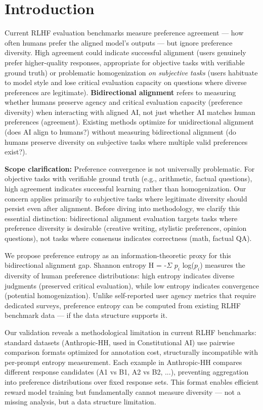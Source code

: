\section{Introduction}

Current RLHF evaluation benchmarks measure preference agreement — how often humans prefer the aligned model's outputs — but ignore preference diversity. High agreement could indicate successful alignment (users genuinely prefer higher-quality responses, appropriate for objective tasks with verifiable ground truth) or problematic homogenization \textit{on subjective tasks} (users habituate to model style and lose critical evaluation capacity on questions where diverse preferences are legitimate). \textbf{Bidirectional alignment} refers to measuring whether humans preserve agency and critical evaluation capacity (preference diversity) when interacting with aligned AI, not just whether AI matches human preferences (agreement). Existing methods optimize for unidirectional alignment (does AI align to humans?) without measuring bidirectional alignment (do humans preserve diversity on subjective tasks where multiple valid preferences exist?).

\textbf{Scope clarification:} Preference convergence is not universally problematic. For objective tasks with verifiable ground truth (e.g., arithmetic, factual questions), high agreement indicates successful learning rather than homogenization. Our concern applies primarily to subjective tasks where legitimate diversity should persist even after alignment. Before diving into methodology, we clarify this essential distinction: bidirectional alignment evaluation targets tasks where preference diversity is desirable (creative writing, stylistic preferences, opinion questions), not tasks where consensus indicates correctness (math, factual QA).

We propose preference entropy as an information-theoretic proxy for this bidirectional alignment gap. Shannon entropy H = -$\Sigma$ $p_i$ log($p_i$) measures the diversity of human preference distributions: high entropy indicates diverse judgments (preserved critical evaluation), while low entropy indicates convergence (potential homogenization). Unlike self-reported user agency metrics that require dedicated surveys, preference entropy can be computed from existing RLHF benchmark data — if the data structure supports it.

Our validation reveals a methodological limitation in current RLHF benchmarks: standard datasets (Anthropic-HH, used in Constitutional AI) use pairwise comparison formats optimized for annotation cost, structurally incompatible with per-prompt entropy measurement. Each example in Anthropic-HH compares different response candidates (A1 vs B1, A2 vs B2, ...), preventing aggregation into preference distributions over fixed response sets. This format enables efficient reward model training but fundamentally cannot measure diversity — not a missing analysis, but a data structure limitation.

